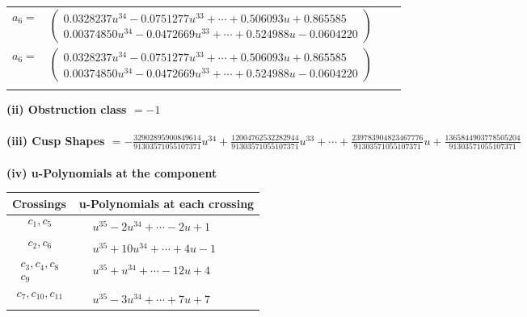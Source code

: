 \documentclass[1p]{elsarticle_modified}
\theoremstyle{definition}
\begin{document}
\begin{tabular}{m{7pt} m{180pt} m{7pt} m{180pt} }
\flushright $a_{6}=$&$\begin{pmatrix}0.0328237 u^{34}-0.0751277 u^{33}+\cdots+0.506093 u+0.865585\\0.00374850 u^{34}-0.0472669 u^{33}+\cdots+0.524988 u-0.0604220\end{pmatrix}$\\ \flushright $a_{6}=$&$\begin{pmatrix}0.0328237 u^{34}-0.0751277 u^{33}+\cdots+0.506093 u+0.865585\\0.00374850 u^{34}-0.0472669 u^{33}+\cdots+0.524988 u-0.0604220\end{pmatrix}$\\&\end{tabular}
\flushleft \textbf{(ii) Obstruction class $= -1$}\\~\\
\flushleft \textbf{(iii) Cusp Shapes $= -\frac{32902895900849614}{91303571055107371} u^{34}+\frac{12004762532282944}{91303571055107371} u^{33}+\cdots+\frac{239783904823467776}{91303571055107371} u+\frac{1365844903778505204}{91303571055107371}$}\\~\\
\newpage\renewcommand{\arraystretch}{1}
\flushleft \textbf{(iv) u-Polynomials at the component}\newline \\
\begin{tabular}{m{50pt}|m{274pt}}
Crossings & \hspace{64pt}u-Polynomials at each crossing \\
\hline $$\begin{aligned}c_{1},c_{5}\end{aligned}$$&$\begin{aligned}
&u^{35}-2 u^{34}+\cdots-2 u+1
\end{aligned}$\\
\hline $$\begin{aligned}c_{2},c_{6}\end{aligned}$$&$\begin{aligned}
&u^{35}+10 u^{34}+\cdots+4 u-1
\end{aligned}$\\
\hline $$\begin{aligned}c_{3},c_{4},c_{8}\\c_{9}\end{aligned}$$&$\begin{aligned}
&u^{35}+u^{34}+\cdots-12 u+4
\end{aligned}$\\
\hline $$\begin{aligned}c_{7},c_{10},c_{11}\end{aligned}$$&$\begin{aligned}
&u^{35}-3 u^{34}+\cdots+7 u+7
\end{aligned}$\\
\hline
\end{tabular}\\~\\
\end{document}
